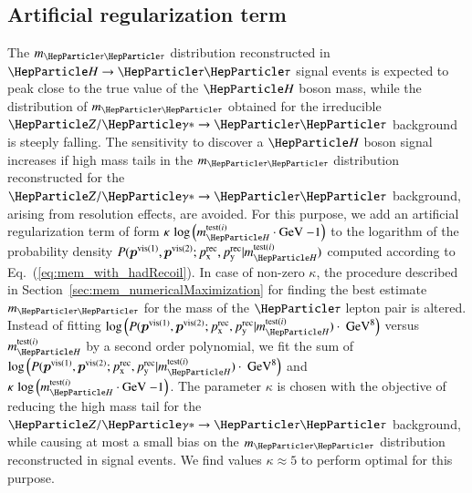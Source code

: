 \subsection{Artificial regularization term}
\label{sec:mem_logM}

The $m_{\Pgt\Pgt}$ distribution reconstructed in $\PHiggs \to \Pgt\Pgt$ signal events is expected to peak close to the true value of the $\PHiggs$ boson mass,
while the distribution of $m_{\Pgt\Pgt}$ obtained for the irreducible $\PZ/\Pggx \to \Pgt\Pgt$ background is steeply falling.
The sensitivity to discover a $\PHiggs$ boson signal increases if high mass tails in the $m_{\Pgt\Pgt}$ distribution reconstructed 
for the $\PZ/\Pggx \to \Pgt\Pgt$ background, arising from resolution effects, are avoided.
For this purpose,
we add an artificial regularization term of form 
$\kappa \, \log \left( m_{\PHiggs}^{\textrm{test}(i)} \cdot \mbox{GeV}~{-1} \right)$ 
to the logarithm of the probability density $P(\bm{p}^{\vis(1)},\bm{p}^{\vis(2)};\pX^{\rec},\pY^{\rec}|m_{\PHiggs}^{\textrm{test}(i)})$
computed according to Eq.~(\ref{eq:mem_with_hadRecoil}).
In case of non-zero $\kappa$,
the procedure described in Section~\ref{sec:mem_numericalMaximization} for finding the best estimate $m_{\Pgt\Pgt}$ for the mass of the $\Pgt$ lepton pair is altered.
Instead of fitting 
$\log \left( P(\bm{p}^{\vis(1)},\bm{p}^{\vis(2)};\pX^{\rec},\pY^{\rec}|m_{\PHiggs}^{\textrm{test}(i)}) \cdot \mbox{~GeV}^{8} \right)$ 
versus $m_{\PHiggs}^{\textrm{test}(i)}$ by a second order polynomial,
we fit the sum of $\log \left( P(\bm{p}^{\vis(1)},\bm{p}^{\vis(2)};\pX^{\rec},\pY^{\rec}|m_{\PHiggs}^{\textrm{test}(i)}) \cdot \mbox{~GeV}^{8} \right)$
and $\kappa \, \log \left( m_{\PHiggs}^{\textrm{test}(i)} \cdot \mbox{GeV}~{-1} \right)$.
The parameter $\kappa$ is chosen with the objective of reducing the high mass tail for the $\PZ/\Pggx \to \Pgt\Pgt$ background,
while causing at most a small bias on the $m_{\Pgt\Pgt}$ distribution reconstructed in signal events.
We find values $\kappa \approx 5$ to perform optimal for this purpose.
